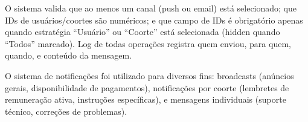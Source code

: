 O sistema valida que ao menos um canal (push ou email) está selecionado; que IDs de usuários/coortes são numéricos; e que campo de IDs é obrigatório apenas quando estratégia ``Usuário'' ou ``Coorte'' está selecionada (hidden quando ``Todos'' marcado). Log de todas operações registra quem enviou, para quem, quando, e conteúdo da mensagem.

O sistema de notificações foi utilizado para diversos fins: broadcasts (anúncios gerais, disponibilidade de pagamentos), notificações por coorte (lembretes de remuneração ativa, instruções específicas), e mensagens individuais (suporte técnico, correções de problemas).


